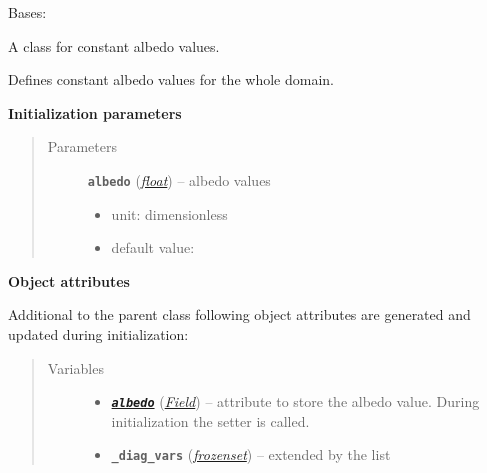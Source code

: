 \documentclass[letterpaper,10pt,english]{sphinxmanual}
\begin{document}
\begin{fulllineitems}
\label{api/climlab.surface:climlab.surface.albedo.ConstantAlbedo}
Bases: {\hyperref[api/climlab.process:climlab.process.diagnostic.DiagnosticProcess]{\emph{}}}

A class for constant albedo values.

Defines constant albedo values for the whole domain.

\textbf{Initialization parameters}
\begin{quote}\begin{description}
\item[{Parameters}] \leavevmode
\textbf{\texttt{albedo}} (\href{http://docs.python.org/2.7/library/functions.html\#float}{\emph{float}}) -- 
albedo values
\begin{itemize}
\item {} 
unit: dimensionless

\item {} 
default value: 

\end{itemize}


\end{description}\end{quote}

\textbf{Object attributes}

Additional to the parent class 
{\hyperref[api/climlab.process:climlab.process.diagnostic.DiagnosticProcess]{\emph{}}}
following object attributes are generated and updated during initialization:
\begin{quote}\begin{description}
\item[{Variables}] \leavevmode\begin{itemize}
\item {} 
{\hyperref[api/climlab.surface:module-climlab.surface.albedo]{\emph{\textbf{\texttt{albedo}}}}} ({\hyperref[api/climlab.domain:climlab.domain.field.Field]{\emph{\emph{Field}}}}) -- attribute to store the albedo value. 
During initialization the 
{\hyperref[api/climlab.surface:climlab.surface.albedo.ConstantAlbedo.albedo]{\emph{}}} setter is called.

\item {} 
\textbf{\texttt{\_diag\_vars}} (\href{http://docs.python.org/2.7/library/stdtypes.html\#frozenset}{\emph{frozenset}}) -- extended by the list \code{{[}'albedo',{]}}


\end{itemize}
\end{description}
\end{quote}
\end{fulllineitems}
\end{document}
